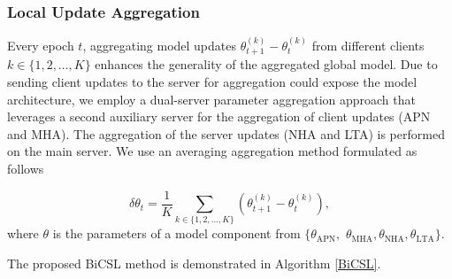 \documentclass[letterpaper]{article} %
\begin{document}
\subsubsection{Local Update Aggregation}
Every epoch $t$, aggregating model updates $\theta_{t+1}^{(k)}-\theta_t^{(k)}$ from different clients $k\in \{1,2,\dots,K\}$ enhances the generality of the aggregated global model. Due to sending client updates to the server for aggregation could expose the model architecture, we employ a dual-server parameter aggregation approach that leverages a second auxiliary server for the aggregation of client updates (APN and MHA). The aggregation of the server updates (NHA and LTA) is performed on the main server. We use an averaging aggregation method formulated as follows

\begin{equation}
 \delta \theta_{t} = \frac{1}{K}\underset{k\in \{1,2,\dots,K\}}{\sum}(\theta_{t+1}^{(k)}-\theta_t^{(k)}),
\end{equation}
where $\theta$ is the parameters of a model component from $\{\theta_{\text{APN}},$
$ \theta_{\text{MHA}}, \theta_{\text{NHA}}, \theta_{\text{LTA}}\}$.

The proposed BiCSL method is demonstrated in Algorithm \ref{BiCSL}.
\end{document}
